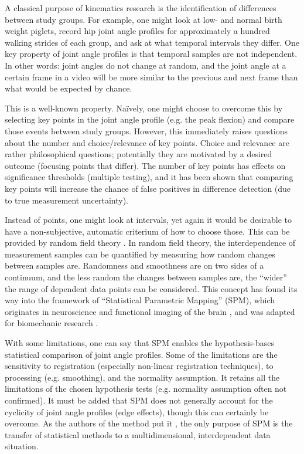 \begin{change}
A classical purpose of kinematics research is the identification of differences between study groups.
For example, one might look at low- and normal birth weight piglets, record hip joint angle profiles for approximately a hundred walking strides of each group, and ask at what temporal intervals they differ.
One key property of joint angle profiles is that temporal samples are not independent.
In other words: joint angles do not change at random, and the joint angle at a certain frame in a video will be more similar to the previous and next frame than what would be expected by chance.

This is a well-known property.
Naïvely, one might choose to overcome this by selecting key points in the joint angle profile (e.g. the peak flexion) and compare those events between study groups.
However, this immediately raises questions about the number and choice/relevance of key points.
Choice and relevance are rather philosophical questions; potentially they are motivated by a desired outcome (focusing points that differ).
The number of key points has effects on significance thresholds (multiple testing), and it has been shown that comparing key points will increase the chance of false positives in difference detection (due to true measurement uncertainty).


Instead of points, one might look at intervals, yet again it would be desirable to have a non-subjective, automatic criterium of how to choose those.
This can be provided by random field theory \citep{Brett2003,Kemeny1976}.
In random field theory, the interdependence of measurement samples can be quantified by measuring how random changes between samples are.
Randomness and smoothness are on two sides of a continuum, and the less random the changes between samples are, the ``wider'' the range of dependent data points can be considered.
This concept has found its way into the framework of ``Statistical Parametric Mapping'' (SPM), which originates in neuroscience and functional imaging of the brain \citep{Friston1994,Friston2003,Friston2008,Worsley2004}, and was adapted for biomechanic research \citep{Pataky2008,Pataky2010,Pataky2013}.

With some limitations, one can say that SPM enables the hypothesis-bases statistical comparison of joint angle profiles.
Some of the limitations are the sensitivity to registration (especially non-linear registration techniques), to processing (e.g. smoothing), and the normality assumption.
It retains all the limitations of the chosen hypothesis tests (e.g. normality assumption often not confirmed).
It must be added that SPM does not generally account for the cyclicity of joint angle profiles (edge effects), though this can certainly be overcome.
As the authors of the method put it \citep{Pataky2020}, the only purpose of SPM is the transfer of statistical methods to a multidimensional, interdependent data situation.



\end{change}
